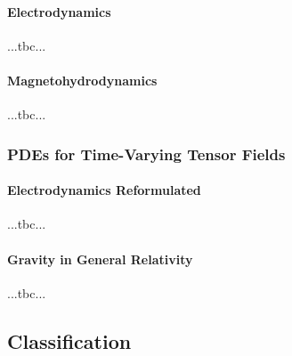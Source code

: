 




\paragraph{Electrodynamics} ...tbc...


\paragraph{Magnetohydrodynamics} ...tbc...




\subsubsection{PDEs for Time-Varying Tensor Fields}

\paragraph{Electrodynamics Reformulated} ...tbc...

\paragraph{Gravity in General Relativity} ...tbc...






\subsection{Classification}


